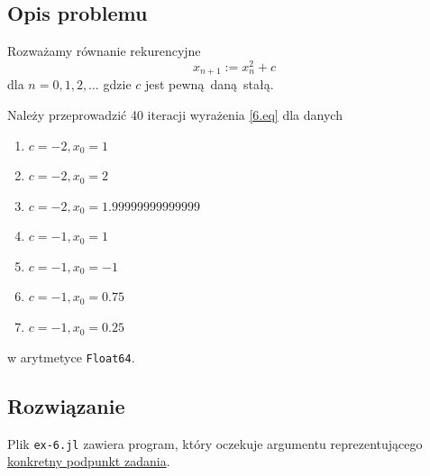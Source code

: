 \documentclass[10pt]{article}
\begin{document}
\subsection{Opis problemu}

Rozważamy równanie rekurencyjne
\begin{equation}
    x_{n+1} := x_n^2 + c
    \label{6.eq}
\end{equation}
dla $n = 0,1,2,\dots$ gdzie $c$ jest pewną daną stałą.

Należy przeprowadzić 40 iteracji wyrażenia \ref{6.eq} dla danych
\begin{enumerate}\label{6.podpunkty}
    \item $c = -2, x_0 = 1$
    \item $c = -2, x_0 = 2$
    \item $c = -2, x_0 = 1.99999999999999$
    \item $c = -1, x_0 = 1$
    \item $c = -1, x_0 = -1$
    \item $c = -1, x_0 = 0.75$
    \item $c = -1, x_0 = 0.25$
\end{enumerate}
w arytmetyce \texttt{Float64}.

\subsection{Rozwiązanie}

Plik \texttt{ex-6.jl} zawiera program, który oczekuje argumentu reprezentującego \hyperref[6.podpunkty]{konkretny podpunkt zadania}.
\end{document}
